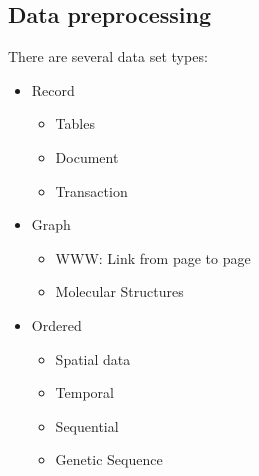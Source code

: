 \documentclass[12pt]{article}
\begin{document}
\subsection{Data preprocessing}
There are several data set types:
\begin{itemize}
  \item Record
  \begin{itemize}
    \item Tables
    \item Document
    \item Transaction
  \end{itemize}
  \item Graph
  \begin{itemize}
    \item WWW: Link from page to page
    \item Molecular Structures
  \end{itemize}
  \item Ordered
  \begin{itemize}
    \item Spatial data
    \item Temporal
    \item Sequential
    \item Genetic Sequence
  \end{itemize}
\end{itemize}
\end{document}
